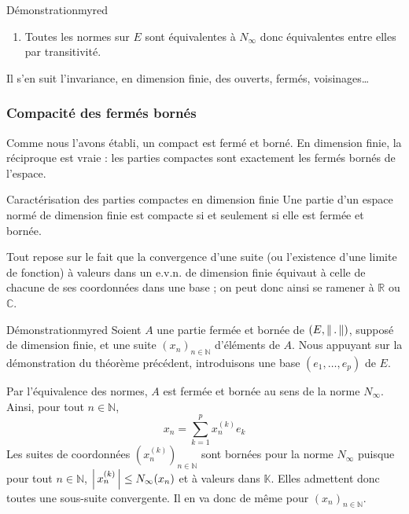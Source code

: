 \begin{demo}{Démonstration}{myred}
\begin{enumerate}
            La sphère unité $\mathcal{S}$ étant compacte, l’application continue $\norm{.}$ est ainsi bornée sur $\mathcal{S}$ et atteint ses bornes. Comme elle est de plus à valeurs positives, il existe $\alpha, \beta \in \mathbb{R}_+^*$ tels que 
            \[ \forall y \in E, N_{\infty}(y) = 1 \implies \alpha \leq \norm{y} \leq \beta \] 
            Soit $x \in E$ non nul. $\frac{x}{N_{\infty}(x)}$ étant unitaire au sens de $N_{\infty}$, $\alpha \leq \norm{\frac{x}{N_{\infty}(x)}} \leq \beta$, soit $\alpha N_{\infty}(x) \leq \norm{x} \leq \beta N_{\infty}(x)$. L’encadrement étant encore valable pour $x = 0_E$, on a montré l’équivalence des normes $\norm{.}$ et $N_{\infty}$.

            \item Toutes les normes sur $E$ sont équivalentes à $N_{\infty}$ donc équivalentes entre elles par transitivité.
        \end{enumerate}
    \end{demo}

    Il s’en suit l’invariance, en dimension finie, des ouverts, fermés, voisinages\ldots

    \subsubsection{Compacité des fermés bornés}

    Comme nous l’avons établi, un compact est fermé et borné. En dimension finie, la réciproque est vraie : les parties compactes sont exactement les fermés bornés de l’espace.

    \begin{theo}{Caractérisation des parties compactes en dimension finie}{}
        Une partie d’un espace normé de dimension finie est compacte si et seulement si elle est fermée et bornée.
    \end{theo}

    Tout repose sur le fait que la convergence d’une suite (ou l’existence d’une limite de fonction) à valeurs dans un e.v.n. de dimension finie équivaut à celle de chacune de ses coordonnées dans une base ; on peut donc ainsi se ramener à $\mathbb{R}$ ou $\mathbb{C}$.

    \begin{demo}{Démonstration}{myred}
        Soient $A$ une partie fermée et bornée de $\left(E, \left\lVert \,. \, \right\rVert\right)$, supposé de dimension finie, et une suite $(x_n)_{n \in \mathbb{N}}$ d’éléments de $A$. Nous appuyant sur la démonstration du théorème précédent, introduisons une base $(e_1,\ldots, e_p)$ de $E$.

        Par l’équivalence des normes, $A$ est fermée et bornée au sens de la norme $N_{\infty}$. Ainsi, pour tout $n \in \mathbb{N}$, 
        \[ x_n = \sum_{k=1}^p x_n^{(k)} e_k \]
        Les suites de coordonnées $(x_n^{(k)})_{n \in \mathbb{N}}$ sont bornées pour la norme $N_{\infty}$ puisque pour tout $n \in \mathbb{N}$, $\left\lvert \,x_n^{(k)} \, \right\rvert \leq N_{\infty}(x_n)$ et à valeurs dans $\mathbb{K}$. Elles admettent donc toutes une sous-suite convergente. Il en va donc de même pour $(x_n)_{n \in \mathbb{N}}$.
    \end{demo}

